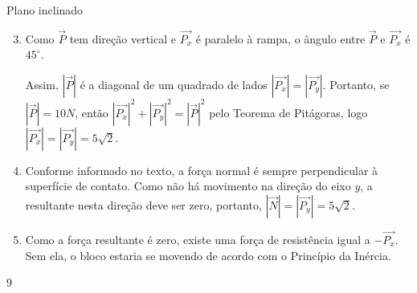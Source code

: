 \begin{answer}{Plano inclinado}
{
\begin{enumerate}\setcounter{enumi}{2}
\item {} 
Como \(\vec{P}\) tem direção vertical e \(\vec{P_x}\) é paralelo à rampa, o ângulo entre \(\vec{P}\) e \(\vec{P_x}\) é \(45^{\circ}\).


\begin{figure}[H]
\centering

\end{figure}


Assim, \(|\vec{P}|\) é a diagonal de um quadrado de lados \(|\vec{P_x}| = |\vec{P_y}|\). Portanto, se \(|\vec{P}| = 10N\), então \(|\vec{P_x}|^2 + |\vec{P_y}|^2 = |\vec{P}|^2\) pelo Teorema de Pitágoras, logo \(|\vec{P_x}| = |\vec{P_y}| = 5\sqrt{2}\).

\item {} 
Conforme informado no texto, a força normal é sempre perpendicular à superfície de contato. Como não há movimento na direção do eixo \(y\), a resultante nesta direção deve ser zero, portanto, \(|\vec{N}|=|\vec{P_y}|=5\sqrt{2}\).

\item {} 
Como a força resultante é zero, existe uma força de resistência igual a \(-\vec{P_x}\). Sem ela, o bloco estaria se movendo de acordo com o Princípio da Inércia.
\end{enumerate}
}{9}
\end{answer}

